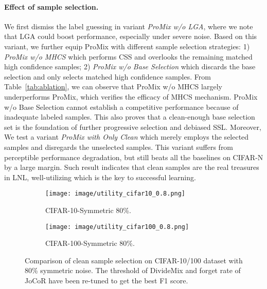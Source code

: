 \documentclass{article}
\begin{document}
\paragraph{Effect of sample selection.}
We first dismiss the label guessing in variant \emph{ProMix w/o LGA}, where we note that LGA could boost performance, especially under severe noise. Based on this variant, we further equip ProMix with different sample selection strategies:  1) \emph{ProMix w/o MHCS} which performs CSS and overlooks the remaining matched high confidence samples; 2) \emph{ProMix w/o Base Selection} which discards the base selection and only selects matched high confidence samples. From Table~\ref{tab:ablation}, we can observe that ProMix w/o MHCS largely underperforms ProMix, which verifies the efficacy of MHCS mechanism. ProMix w/o Base Selection cannot establish a competitive performance because of inadequate labeled samples. This also proves that a clean-enough base selection set is the foundation of further progressive selection and debiased SSL. Moreover, We test a variant \emph{ProMix with Only Clean} which merely employs the selected samples and disregards the unselected samples. This variant suffers from perceptible performance degradation, but still beats all the baselines on CIFAR-N by a large margin. Such result indicates that clean samples are the real treasures in LNL, well-utilizing which is the key to successful learning.



\begin{figure}[t]
     \centering 
     \begin{subfigure}{0.49\linewidth}
         \texttt{[image: image/utility\_cifar10\_0.8.png]}
         \caption{CIFAR-10-Symmetric 80\%.}
     \end{subfigure}
     \hfill
     \begin{subfigure}{0.49\linewidth}
         \texttt{[image: image/utility\_cifar100\_0.8.png]}
         \caption{CIFAR-100-Symmetric 80\%.}
     \end{subfigure}
     \caption{Comparison of clean sample selection on CIFAR-10/100 dataset with 80\% symmetric noise. The threshold of DivideMix and forget rate of JoCoR have been re-tuned to get the best F1 score.}
     \label{fig:utility}
\end{figure}
\end{document}
